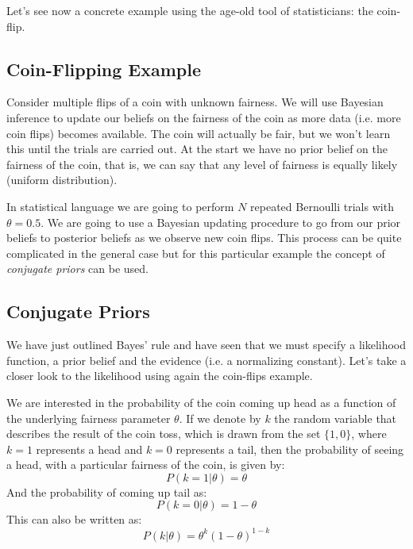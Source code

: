 Let's see now a concrete example using the age-old tool of statisticians: the coin-flip.

\subsection{Coin-Flipping Example}
Consider multiple flips of a coin with unknown fairness. We will use Bayesian inference to update our beliefs on the fairness of the coin as more data (i.e. more coin flips) becomes available. The coin will actually be fair, but we won't learn this until the trials are carried out. At the start we have no prior belief on the fairness of the coin, that is, we can say that any level of fairness is equally likely (uniform distribution).

In statistical language we are going to perform $N$ repeated Bernoulli trials with $\theta=0.5$. %
We are going to use a Bayesian updating procedure to go from our prior beliefs to posterior beliefs as we observe new coin flips. 
This process can be quite complicated in the general case but for this particular example the concept of \emph{conjugate priors} can be used.

\subsection{Conjugate Priors}
We have just outlined Bayes' rule and have seen that we must specify a likelihood function, a prior belief and the evidence (i.e. a normalizing constant). Let's take a closer look to the likelihood using again the coin-flips example.

We are interested in the probability of the coin coming up head as a function of the underlying fairness parameter $\theta$.
If we denote by $k$ the random variable that describes the result of the coin toss, which is drawn from the set $\{1, 0\}$, where $k=1$ represents a head and $k=0$ represents a tail, then the probability of seeing a head, with a particular fairness of the coin, is given by:
\begin{equation}
  P(k=1|\theta) = \theta 
\end{equation}
And the probability of coming up tail as:
\begin{equation}
  P(k=0|\theta) = 1-\theta 
\end{equation}
This can also be written as:
\begin{equation}
  P(k|\theta) = \theta^k(1-\theta)^{1-k} 
\end{equation}

